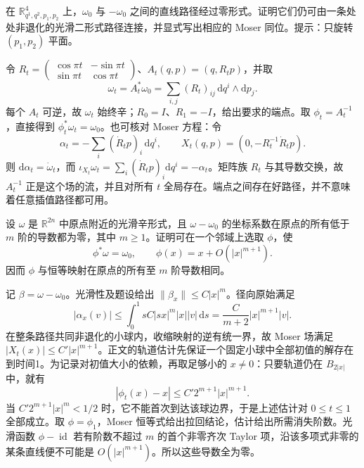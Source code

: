 \begin{exercise}\label{g4:ex:0801:nonlinear-path}
	在 \(\mathbb R^4_{q^1,q^2,p_1,p_2}\) 上，\(\omega_0\) 与 \(-\omega_0\) 之间的直线路径经过零形式。证明它们仍可由一条处处非退化的光滑二形式路径连接，并显式写出相应的 Moser 同位。提示：只旋转 \((p_1,p_2)\) 平面。
\end{exercise}
\begin{solution}
	令 \(R_t=\begin{pmatrix}\cos\pi t&-\sin\pi t\\\sin\pi t&\cos\pi t\end{pmatrix}\)、\(A_t(q,p)=(q,R_tp)\)，并取
	\[
		\omega_t=A_t^*\omega_0
		=\sum_{i,j}(R_t)_{ij}\,\mathrm{d}q^i\wedge\mathrm{d}p_j.
	\]
	每个 \(A_t\) 可逆，故 \(\omega_t\) 始终辛；\(R_0=I\)、\(R_1=-I\)，给出要求的端点。取 \(\phi_t=A_t^{-1}\)，直接得到 \(\phi_t^*\omega_t=\omega_0\)。也可核对 Moser 方程：令
	\[
		\alpha_t=-\sum_i(\dot R_tp)_i\,\mathrm{d}q^i,
		\qquad X_t(q,p)=(0,-R_t^{-1}\dot R_tp).
	\]
	则 \(\mathrm{d}\alpha_t=\dot\omega_t\)，而 \(\iota_{X_t}\omega_t=\sum_i(\dot R_tp)_i\mathrm{d}q^i=-\alpha_t\)。矩阵族 \(R_t\) 与其导数交换，故 \(A_t^{-1}\) 正是这个场的流，并且对所有 \(t\) 全局存在。端点之间存在好路径，并不意味着任意插值路径都可用。
\end{solution}

\begin{exercise}\label{g4:ex:0802:higher-jets}
	设 \(\omega\) 是 \(\mathbb R^{2n}\) 中原点附近的光滑辛形式，且 \(\omega-\omega_0\) 的坐标系数在原点的所有低于 \(m\) 阶的导数都为零，其中 \(m\ge1\)。证明可在一个邻域上选取 \(\phi\)，使
	\[
		\phi^*\omega=\omega_0,\qquad
		\phi(x)=x+O(|x|^{m+1}).
	\]
	因而 \(\phi\) 与恒等映射在原点的所有至 \(m\) 阶导数相同。
\end{exercise}
\begin{solution}
	记 \(\beta=\omega-\omega_0\)。光滑性及题设给出 \(\|\beta_x\|\le C|x|^m\)。径向原始满足
	\[
		|\alpha_x(v)|
		\le\int_0^1sC|sx|^m|x||v|\,\mathrm{d}s
		=\frac C{m+2}|x|^{m+1}|v|.
	\]
	在整条路径共同非退化的小球内，收缩映射的逆有统一界，故 Moser 场满足 \(|X_t(x)|\le C'|x|^{m+1}\)。正文的轨道估计先保证一个固定小球中全部初值的解存在到时间1。为记录对初值大小的依赖，再取足够小的 \(x\ne0\)：只要轨道仍在 \(B_{2|x|}\) 中，就有
	\[
		|\phi_t(x)-x|\le C'2^{m+1}|x|^{m+1}.
	\]
	当 \(C'2^{m+1}|x|^m<1/2\) 时，它不能首次到达该球边界，于是上述估计对 \(0\le t\le1\) 全部成立。取 \(\phi=\phi_1\)，Moser 恒等式给出拉回结论，估计给出所需消失阶数。光滑函数 \(\phi-\operatorname{id}\) 若有阶数不超过 \(m\) 的首个非零齐次 Taylor 项，沿该多项式非零的某条直线便不可能是 \(O(|x|^{m+1})\)。所以这些导数全为零。
\end{solution}

